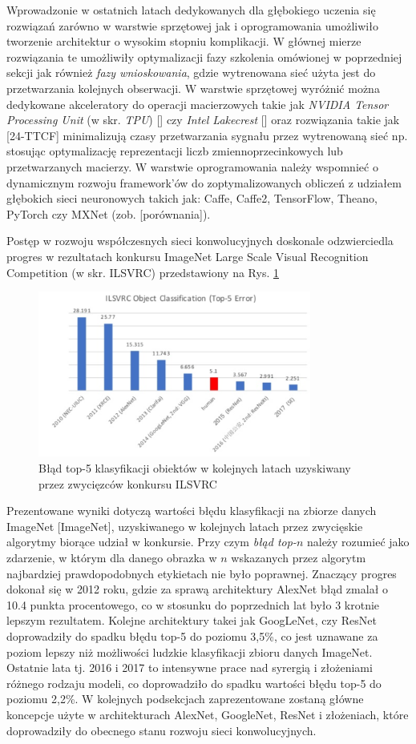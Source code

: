 Wprowadzonie w ostatnich latach dedykowanych dla głębokiego uczenia się rozwiązań zarówno w warstwie sprzętowej jak i oprogramowania umożliwiło tworzenie architektur o wysokim stopniu komplikacji. W głównej mierze rozwiązania te umożliwiły optymalizacji fazy szkolenia omówionej w poprzedniej sekcji jak również \textit{fazy wnioskowania}, gdzie wytrenowana sieć użyta jest do przetwarzania kolejnych obserwacji. W warstwie sprzętowej  wyróżnić można dedykowane akceleratory do operacji macierzowych takie jak \textit{NVIDIA Tensor Processing Unit} (w skr. \textit{TPU}) [] czy \textit{Intel Lakecrest} [] oraz rozwiązania takie jak [24-TTCF] minimalizują czasy przetwarzania sygnału przez wytrenowaną sieć np. stosując optymalizację reprezentacji liczb zmiennoprzecinkowych lub przetwarzanych macierzy. W warstwie oprogramowania należy wspomnieć o dynamicznym rozwoju framework'ów do zoptymalizowanych obliczeń z udziałem głębokich sieci neuronowych takich jak: Caffe, Caffe2, TensorFlow, Theano, PyTorch czy MXNet (zob. [porównania]).

Postęp w rozwoju współczesnych sieci konwolucyjnych doskonale odzwierciedla progres w rezultatach konkursu ImageNet Large Scale Visual Recognition Competition (w skr. ILSVRC) przedstawiony na Rys. \ref{ILSVRC}
\begin{figure}[h!]
	\centering
	\includegraphics[width=0.8\textwidth]{figures/ILSVRC.png}
	\caption{Błąd top-5 klasyfikacji obiektów w kolejnych latach uzyskiwany przez zwycięzców konkursu ILSVRC}
	\label{ILSVRC}
\end{figure}
Prezentowane wyniki dotyczą wartości błędu klasyfikacji na zbiorze danych ImageNet [ImageNet], uzyskiwanego w kolejnych latach przez zwycięskie algorytmy biorące udział w konkursie. Przy czym \textit{błąd top-$n$} należy rozumieć jako zdarzenie, w którym dla danego obrazka w $n$ wskazanych przez algorytm najbardziej prawdopodobnych etykietach nie było poprawnej. Znaczący progres dokonał się w 2012 roku, gdzie za sprawą architektury AlexNet błąd zmalał o 10.4 punkta procentowego, co w stosunku do poprzednich lat było 3 krotnie lepszym rezultatem. Kolejne architektury takei jak GoogLeNet, czy ResNet doprowadziły do spadku błędu top-5 do poziomu 3,5\%, co jest uznawane za poziom lepszy niż możliwości ludzkie klasyfikacji zbioru danych ImageNet. Ostatnie lata tj. 2016 i 2017 to intensywne prace nad syrergią i złożeniami różnego rodzaju modeli, co doprowadziło do spadku wartości błędu top-5 do poziomu 2,2\%. W kolejnych podsekcjach zaprezentowane zostaną główne koncepcje użyte w architekturach AlexNet, GoogleNet, ResNet i złożeniach, które doprowadziły do obecnego stanu rozwoju sieci konwolucyjnych. 

